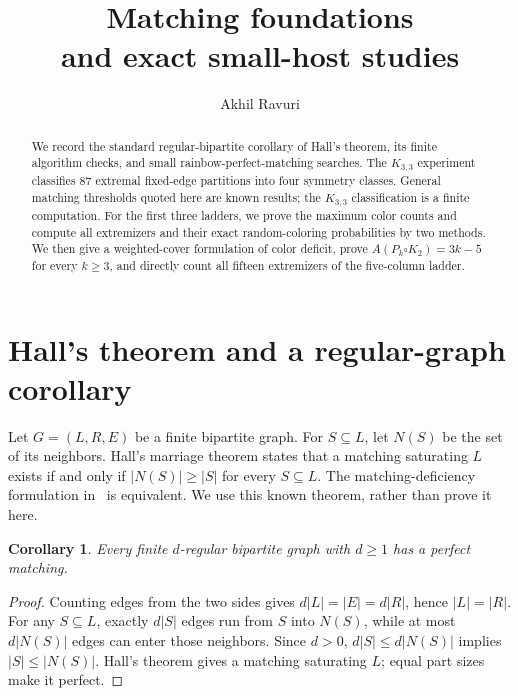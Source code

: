 \documentclass[11pt,letterpaper]{article}
\title{\vspace{-1.5em}\LARGE\bfseries Matching foundations\\and exact small-host studies}
\author{Akhil Ravuri}\date{}
\newtheorem{corollary}[theorem]{Corollary}
\begin{document}
\maketitle\vspace{-1.5em}
\begin{abstract}
We record the standard regular-bipartite corollary of Hall's theorem, its
finite algorithm checks, and small rainbow-perfect-matching searches. The
$K_{3,3}$ experiment classifies 87 extremal fixed-edge partitions into four
symmetry classes. General matching thresholds quoted here are known results;
the $K_{3,3}$ classification is a finite computation.
For the first three ladders, we prove the maximum color counts and compute
all extremizers and their exact random-coloring probabilities by two methods.
We then give a weighted-cover formulation of color deficit, prove
$A(P_k\square K_2)=3k-5$ for every $k\ge3$, and directly count all fifteen
extremizers of the five-column ladder.
\end{abstract}

\section{Hall's theorem and a regular-graph corollary}
Let $G=(L,R,E)$ be a finite bipartite graph. For $S\subseteq L$, let $N(S)$
be the set of its neighbors. Hall's marriage theorem states that a matching
saturating $L$ exists if and only if $|N(S)|\ge|S|$ for every $S\subseteq L$.
The matching-deficiency formulation in~\cite[Lemma 2.1]{LTJ} is equivalent.
We use this known theorem, rather than prove it here.

\begin{corollary}
Every finite $d$-regular bipartite graph with $d\ge1$ has a perfect matching.
\end{corollary}
\begin{proof}
Counting edges from the two sides gives $d|L|=|E|=d|R|$, hence $|L|=|R|$.
For any $S\subseteq L$, exactly $d|S|$ edges run from $S$ into $N(S)$, while
at most $d|N(S)|$ edges can enter those neighbors. Since $d>0$,
$d|S|\le d|N(S)|$ implies $|S|\le|N(S)|$. Hall's theorem gives a matching
saturating $L$; equal part sizes make it perfect.
\end{proof}
\end{document}
